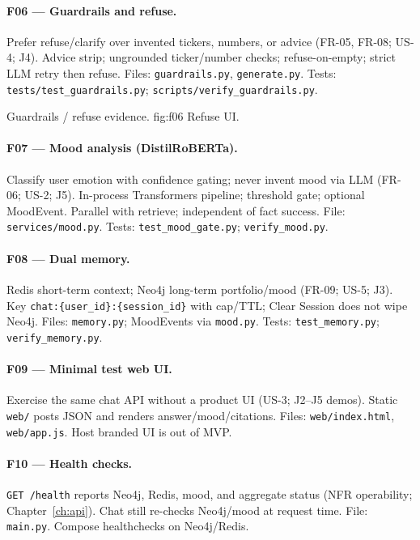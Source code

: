\paragraph{F06 --- Guardrails and refuse.}
Prefer refuse/clarify over invented tickers, numbers, or advice (FR-05, FR-08; US-4; J4). Advice strip; ungrounded ticker/number checks; refuse-on-empty; strict LLM retry then refuse. Files: \texttt{guardrails.py}, \texttt{generate.py}. Tests: \texttt{tests/test\_guardrails.py}; \texttt{scripts/verify\_guardrails.py}.

%
{Guardrails / refuse evidence.}%
{fig:f06}%
{Refuse UI.}

\paragraph{F07 --- Mood analysis (DistilRoBERTa).}
Classify user emotion with confidence gating; never invent mood via LLM (FR-06; US-2; J5). In-process Transformers pipeline; threshold gate; optional MoodEvent. Parallel with retrieve; independent of fact success. File: \texttt{services/mood.py}. Tests: \texttt{test\_mood\_gate.py}; \texttt{verify\_mood.py}.

\paragraph{F08 --- Dual memory.}
Redis short-term context; Neo4j long-term portfolio/mood (FR-09; US-5; J3). Key \texttt{chat:\{user\_id\}:\{session\_id\}} with cap/TTL; Clear Session does not wipe Neo4j. Files: \texttt{memory.py}; MoodEvents via \texttt{mood.py}. Tests: \texttt{test\_memory.py}; \texttt{verify\_memory.py}.

\paragraph{F09 --- Minimal test web UI.}
Exercise the same chat API without a product UI (US-3; J2--J5 demos). Static \texttt{web/} posts JSON and renders answer/mood/citations. Files: \texttt{web/index.html}, \texttt{web/app.js}. Host branded UI is out of MVP.

\paragraph{F10 --- Health checks.}
\texttt{GET /health} reports Neo4j, Redis, mood, and aggregate status (NFR operability; Chapter~\ref{ch:api}). Chat still re-checks Neo4j/mood at request time. File: \texttt{main.py}. Compose healthchecks on Neo4j/Redis.

